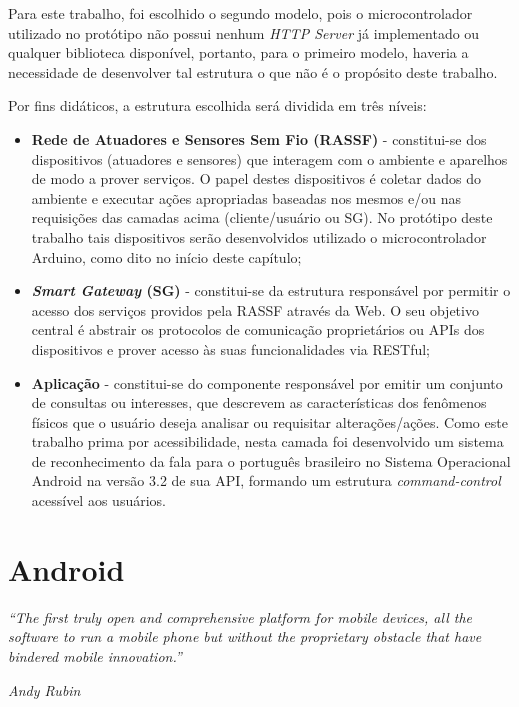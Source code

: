 \documentclass[12pt,a4paper,oneside]{report}
\begin{document}

Para este trabalho, foi escolhido o segundo modelo, pois o microcontrolador utilizado no protótipo não possui nenhum \emph{HTTP Server} já implementado ou qualquer biblioteca disponível, portanto, para o primeiro modelo, haveria a necessidade de desenvolver tal estrutura o que não é o propósito deste trabalho.

Por fins didáticos, a estrutura escolhida será dividida em três níveis:
\begin{itemize}
    \item \textbf{Rede de Atuadores e Sensores Sem Fio (RASSF)} - constitui-se dos dispositivos (atuadores e sensores) que interagem com o ambiente e aparelhos de modo a prover serviços. O papel destes dispositivos é coletar dados do ambiente e executar ações apropriadas baseadas nos mesmos e/ou nas requisições das camadas acima (cliente/usuário ou SG). No protótipo deste trabalho tais dispositivos serão desenvolvidos utilizado o microcontrolador Arduino, como dito no início deste capítulo;
    \item \textbf{\emph{Smart Gateway} (SG)} - constitui-se da estrutura responsável por permitir o acesso dos serviços providos pela RASSF através da Web. O seu objetivo central é abstrair os protocolos de comunicação proprietários ou APIs dos dispositivos e prover acesso às suas funcionalidades via RESTful;
    \item \textbf{Aplicação} - constitui-se do componente responsável por emitir um conjunto de consultas ou interesses, que descrevem as características dos fenômenos físicos que o usuário deseja analisar ou requisitar alterações/ações. Como este trabalho prima por acessibilidade, nesta camada foi desenvolvido um sistema de reconhecimento da fala para o português brasileiro no Sistema Operacional Android na versão 3.2 de sua API, formando um estrutura \emph{command-control} acessível aos usuários.
\end{itemize}

%
%
\section{Android}

\begin{center}
\begin{minipage}{.8\textwidth}
\emph{``The first truly open and comprehensive platform for mobile devices, all the software to run a mobile phone but without the proprietary obstacle that have bindered mobile innovation.''}
\begin{flushright}
    \begin{minipage}{.3\textwidth}
	\emph{Andy Rubin}\cite{Andy Rubin}
    \end{minipage}
\end{flushright}

\end{minipage}
\end{center}
\end{document}

